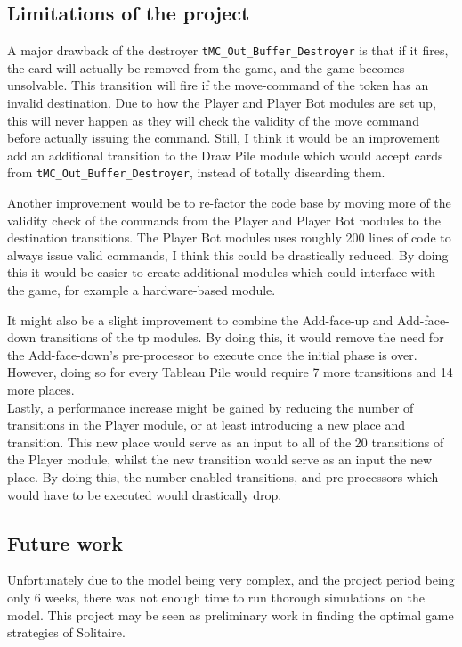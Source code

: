 \documentclass[runningheads,a4paper]{llncs}
\begin{document}
\subsection{Limitations of the project}
\label{sec5:limitations}
A major drawback of the destroyer \verb!tMC_Out_Buffer_Destroyer! is that if it fires, the card will actually be removed from the game, and the game becomes unsolvable. This transition will fire if the move-command of the token has an invalid destination. Due to how the Player and Player Bot modules are set up, this will never happen as they will check the validity of the move command before actually issuing the command. Still, I think it would be an improvement add an additional transition to the Draw Pile module which would accept cards from \verb!tMC_Out_Buffer_Destroyer!, instead of totally discarding them.
\newline

Another improvement would be to re-factor the code base by moving more of the validity check of the commands from the Player and Player Bot modules to the destination transitions. The Player Bot modules uses roughly 200 lines of code to always issue valid commands, I think this could be drastically reduced. By doing this it would be easier to create additional modules which could interface with the game, for example a hardware-based module.
\newline

It might also be a slight improvement to combine the Add-face-up and Add-face-down transitions of the \ac{tp} modules. By doing this, it would remove the need for the Add-face-down's pre-processor to execute once the initial phase is over. However, doing so for every Tableau Pile would require 7 more transitions and 14 more places. \\

Lastly, a performance increase might be gained by reducing the number of transitions in the Player module, or at least introducing a new place and transition. This new place would serve as an input to all of the 20 transitions of the Player module, whilst the new transition would serve as an input the new place. By doing this, the number enabled transitions, and pre-processors which would have to be executed would drastically drop.

\subsection{Future work}
\label{sec5_future_work}
Unfortunately due to the model being very complex, and the project period being only 6 weeks, there was not enough time to run thorough simulations on the model. This project may be seen as preliminary work in finding the optimal game strategies of Solitaire. \\
\end{document}
